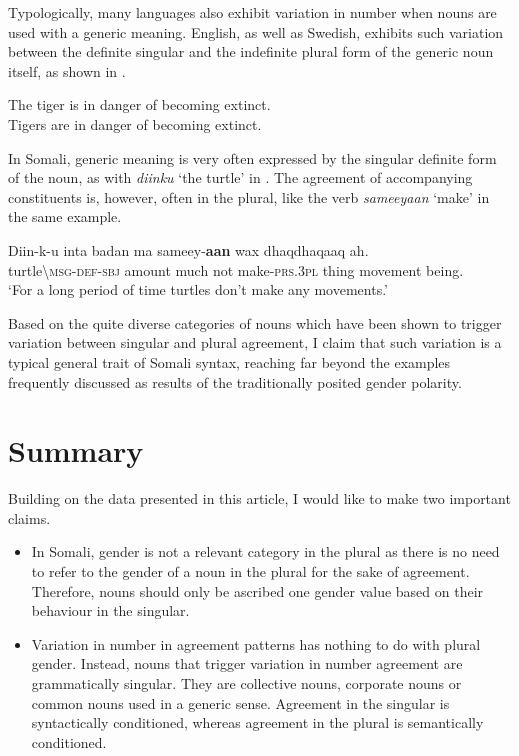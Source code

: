 \documentclass[output=paper]{langsci/langscibook}
\begin{document}
Typologically, many languages also exhibit variation in number when nouns are used with a generic meaning. English, as well as Swedish, exhibits such variation between the definite singular and the indefinite plural form of the generic noun itself, as shown in .

\ea\label{ex:nilsson:10}  
 \ea  The tiger is in danger of becoming extinct.\\
 \ex  Tigers are in danger of becoming extinct.\\
\z
\z


In Somali, generic meaning is very often expressed by the singular definite form of the noun, as with \textit{diinku} ‘the turtle’ in . The agreement of accompanying constituents is, however, often in the plural, like the verb \textit{sameeyaan} ‘make’ in the same example.

\ea\label{ex:nilsson:11}
\gll Diin-k-u    inta  badan  ma  sameey-\textbf{aan}  wax  dhaqdhaqaaq  ah.\\
     turtle{\textbackslash}\textsc{msg-def-sbj}  amount  much  not  make-\textsc{prs.3pl}  thing  movement  being.\\
\glt ‘For a long period of time turtles don’t make any movements.’
\z

Based on the quite diverse categories of nouns which have been shown to trigger variation between singular and plural agreement, I claim that such variation is a typical general trait of Somali syntax, reaching far beyond the examples frequently discussed as results of the traditionally posited gender polarity.  

\section{Summary}\label{sec:nilsson:4}

Building on the data presented in this article, I would like to make two important claims. 


\begin{itemize}
\item In Somali, gender is not a relevant category in the plural as there is no need to refer to the gender of a noun in the plural for the sake of agreement. Therefore, nouns should only be ascribed one gender value based on their behaviour in the singular. 

\item Variation in number in agreement patterns has nothing to do with plural gender. Instead, nouns that trigger variation in number agreement are grammatically singular. They are collective nouns, corporate nouns or common nouns used in a generic sense. Agreement in the singular is syntactically conditioned, whereas agreement in the plural is semantically conditioned.

\end{itemize}
\end{document}
